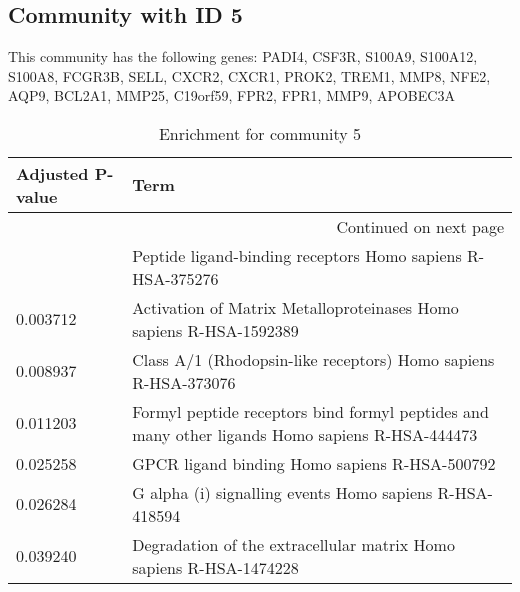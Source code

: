 \subsection*{Community with ID 5}
This community has the following genes: PADI4, CSF3R, S100A9, S100A12, S100A8, FCGR3B, SELL, CXCR2, CXCR1, PROK2, TREM1, MMP8, NFE2, AQP9, BCL2A1, MMP25, C19orf59, FPR2, FPR1, MMP9, APOBEC3A
\\
\begin{longtable}{p{2.4cm}p{14.5cm}}
\caption{Enrichment for community 5}\\
\toprule
Adjusted \newline P-value &                                                                                            Term \\
\midrule
\endhead
\midrule
\multicolumn{2}{r}{{Continued on next page}} \\
\midrule
\endfoot

\bottomrule
\endlastfoot
                 0.002182 &                                      Peptide ligand-binding receptors Homo sapiens R-HSA-375276 \\
                 0.003712 &                              Activation of Matrix Metalloproteinases Homo sapiens R-HSA-1592389 \\
                 0.008937 &                                  Class A/1 (Rhodopsin-like receptors) Homo sapiens R-HSA-373076 \\
                 0.011203 &  Formyl peptide receptors bind formyl peptides and many other ligands Homo sapiens R-HSA-444473 \\
                 0.025258 &                                                   GPCR ligand binding Homo sapiens R-HSA-500792 \\
                 0.026284 &                                         G alpha (i) signalling events Homo sapiens R-HSA-418594 \\
                 0.039240 &                              Degradation of the extracellular matrix Homo sapiens R-HSA-1474228 \\
\end{longtable}


